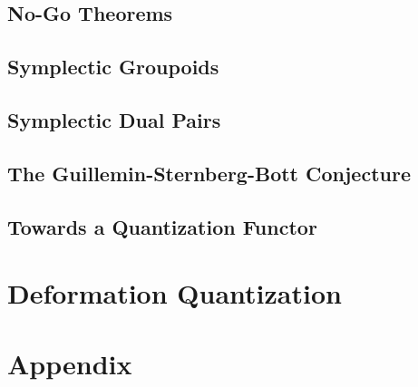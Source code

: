 \documentclass{amsbook} %
\theoremstyle{definition}
\theoremstyle{definition}
\begin{document}
\chapter{No-Go Theorems}


\chapter{Symplectic Groupoids}


\chapter{Symplectic Dual Pairs}


\chapter{The Guillemin-Sternberg-Bott Conjecture}


\chapter{Towards a Quantization Functor}







\part{Deformation Quantization}
\part{Appendix}
\end{document}
